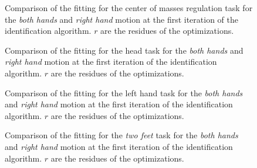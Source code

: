 \documentclass[letterpaper, 10pt, conference]{ieeeconf}      %
\begin{document}

\begin{figure}[t]
  \centering
\caption{Comparison of the fitting for the center of masses regulation task for the \emph{both hands} and \emph{right hand} motion at the first iteration of the identification algorithm.
$r$ are the residues of the optimizations.}
\label{fig:exp1:taskCom0}
\end{figure}

\begin{figure}[t]
  \centering
  \caption{Comparison of the fitting for the head task for the
    \emph{both hands} and \emph{right hand} motion at the first
    iteration of the identification algorithm.  $r$ are
    the residues of the optimizations.}
  \label{fig:exp1:taskHead0}
\end{figure}

\begin{figure}[t]
  \centering
  \caption{Comparison of the fitting for the left hand task for the
    \emph{both hands} and \emph{right hand} motion at the first
    iteration of the identification algorithm.  $r$ are
    the residues of the optimizations.}
  \label{fig:exp1:taskLhand0}
\end{figure}

\begin{figure}[t]
  \centering
\caption{Comparison of the fitting for the \emph{two feet} task for the
   \emph{both hands} and \emph{right hand} motion at the first
   iteration of the identification algorithm.  $r$ are the
   residues of the optimizations.}
\label{fig:exp1:taskTwofeet0}
\end{figure}
\end{document}
